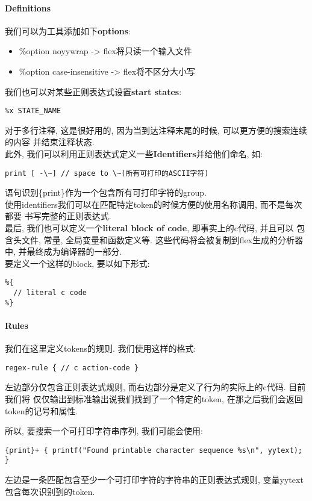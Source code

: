 \paragraph{Definitions}
我们可以为工具添加如下\textbf{options}:
\begin{itemize}
	\item \%option noyywrap -> flex将只读一个输入文件
	\item \%option case-insensitive -> flex将不区分大小写
\end{itemize}
我们也可以对某些正则表达式设置\textbf{start states}: \\
\begin{lstlisting}
%x STATE_NAME
\end{lstlisting}
对于多行注释, 这是很好用的, 因为当到达注释末尾的时候, 可以更方便的搜索连续的内容
并结束注释状态. \\
此外, 我们可以利用正则表达式定义一些\textbf{Identifiers}并给他们命名, 如: \\
\begin{lstlisting}
print [ -\~] // space to \~(所有可打印的ASCII字符)
\end{lstlisting}
语句识别\{print\}作为一个包含所有可打印字符的group. \\
使用identifiers我们可以在匹配特定token的时候方便的使用名称调用, 而不是每次都要
书写完整的正则表达式. \\
最后, 我们也可以定义一个\textbf{literal block of code}, 即事实上的c代码, 并且可以
包含头文件, 常量, 全局变量和函数定义等. 这些代码将会被复制到flex生成的分析器中,
并最终成为编译器的一部分. \\
要定义一个这样的block, 要以如下形式:
\begin{lstlisting}
%{
  // literal c code
%}
\end{lstlisting}

\paragraph{Rules}
我们在这里定义tokens的规则.
我们使用这样的格式: \\
\begin{lstlisting}
regex-rule { // c action-code }
\end{lstlisting}
左边部分仅包含正则表达式规则, 而右边部分是定义了行为的实际上的c代码. 目前我们将
仅仅输出到标准输出说我们找到了一个特定的token, 在那之后我们会返回token的记号和属性.

所以, 要搜索一个可打印字符串序列, 我们可能会使用: \\
\begin{lstlisting}
{print}+ { printf("Found printable character sequence %s\n", yytext); }
\end{lstlisting}
左边是一条匹配包含至少一个可打印字符的字符串的正则表达式规则, 变量yytext
包含每次识别到的token.

